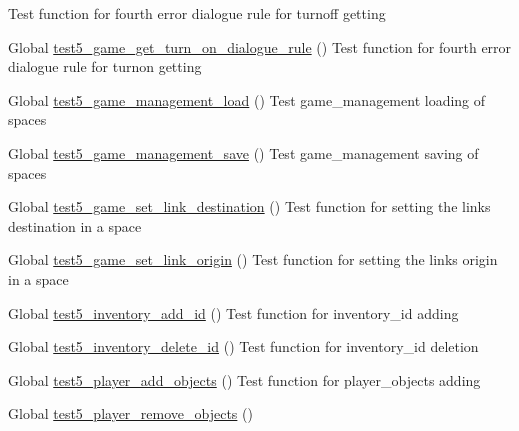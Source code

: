 \begin{DoxyRefList}
%
Test function for fourth error dialogue rule for turnoff getting  
\item[Global \mbox{\hyperlink{game__test_8c_add1017113e30b490ed3995f1afcefb9c}{test5\+\_\+game\+\_\+get\+\_\+turn\+\_\+on\+\_\+dialogue\+\_\+rule}} ()]\label{test__test000359}%
%
Test function for fourth error dialogue rule for turnon getting  
\item[Global \mbox{\hyperlink{game__management__test_8c_a86c2ffa3f6d610bc0cea1719e7a12b4d}{test5\+\_\+game\+\_\+management\+\_\+load}} ()]\label{test__test000113}%
%
Test game\+\_\+management loading of spaces  
\item[Global \mbox{\hyperlink{game__management__test_8c_ab446e78ea3d1c0e31e1119bfd558a26d}{test5\+\_\+game\+\_\+management\+\_\+save}} ()]\label{test__test000127}%
%
Test game\+\_\+management saving of spaces  
\item[Global \mbox{\hyperlink{game__test_8c_a81f006c546920b3fa8da6f7c752fc2fa}{test5\+\_\+game\+\_\+set\+\_\+link\+\_\+destination}} ()]\label{test__test000253}%
%
Test function for setting the link\textquotesingle{}s destination in a space  
\item[Global \mbox{\hyperlink{game__test_8c_a6129188a03378c2dbe8bbb33f8186c43}{test5\+\_\+game\+\_\+set\+\_\+link\+\_\+origin}} ()]\label{test__test000247}%
%
Test function for setting the link\textquotesingle{}s origin in a space  
\item[Global \mbox{\hyperlink{inventory__test_8c_a8e69ae5a26b0115971e51ab94616fb85}{test5\+\_\+inventory\+\_\+add\+\_\+id}} ()]\label{test__test000422}%
%
Test function for inventory\+\_\+id adding  
\item[Global \mbox{\hyperlink{inventory__test_8c_aab7eb915fdca7a990caea3f21b64daf5}{test5\+\_\+inventory\+\_\+delete\+\_\+id}} ()]\label{test__test000427}%
%
Test function for inventory\+\_\+id deletion  
\item[Global \mbox{\hyperlink{player__test_8c_a509c75d75bde89f9b39149d4d3c24d25}{test5\+\_\+player\+\_\+add\+\_\+objects}} ()]\label{test__test000560}%
%
Test function for player\+\_\+objects adding  
\item[Global \mbox{\hyperlink{player__test_8c_a6512f77cedc43a2b6c75b44b396efd71}{test5\+\_\+player\+\_\+remove\+\_\+objects}} ()]\label{test__test000567}%

\end{DoxyRefList}
